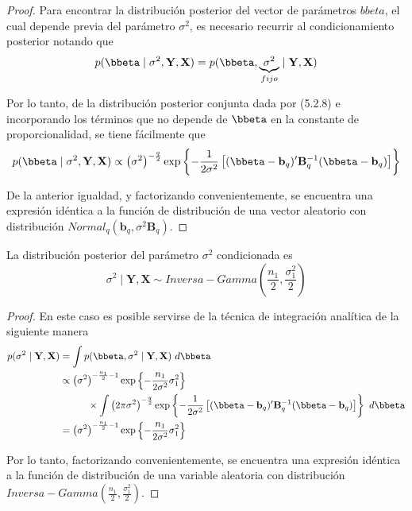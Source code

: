 \begin{proof}
Para encontrar la distribución posterior del vector de parámetros $bbeta$, el cual depende previa del parámetro $\sigma^2$, es necesario recurrir al condicionamiento posterior notando que
\begin{equation*}
p(\bbeta \mid \sigma^2,\mathbf{Y},\mathbf{X})=p(\bbeta,\underbrace{\sigma^2}_{fijo} \mid \mathbf{Y},\mathbf{X})
\end{equation*}

Por lo tanto, de la distribución posterior conjunta dada por (5.2.8) e incorporando los términos que no depende de $\bbeta$ en la constante de proporcionalidad, se tiene fácilmente que
\begin{equation*}
p(\bbeta \mid \sigma^2,\mathbf{Y},\mathbf{X})\propto
\left(\sigma^2\right)^{-\frac{q}{2}}
\exp\left\{-\frac{1}{2\sigma^2}
\left[(\bbeta-\mathbf{b}_q)'\mathbf{B}^{-1}_q(\bbeta-\mathbf{b}_q)\right]
\right\}
\end{equation*}

De la anterior igualdad, y factorizando convenientemente, se encuentra una expresión idéntica a la función de distribución de una vector aleatorio con distribución $Normal_q(\mathbf{b}_q,\sigma^2\mathbf{B}_q)$.
\end{proof}

\begin{Res}
La distribución posterior del parámetro $\sigma^2$ condicionada es
\begin{equation*}
\sigma^2 \mid \mathbf{Y},\mathbf{X} \sim Inversa-Gamma\left(\frac{n_1}{2},\frac{\sigma^2_1}{2}\right)
\end{equation*}
\end{Res}

\begin{proof}
En este caso es posible servirse de la técnica de integración analítica de la siguiente manera
\begin{align*}
p(\sigma^2 \mid \mathbf{Y},\mathbf{X})&=\int p(\bbeta,\sigma^2 \mid \mathbf{Y},\mathbf{X})\ d\bbeta\\
&\propto\left(\sigma^2\right)^{-\frac{n_1}{2}-1}
\exp\left\{-\frac{n_1}{2\sigma^2}\sigma_1^2 \right\}\\
&\hspace{1cm}\times
\int\left(2\pi \sigma^2\right)^{-\frac{q}{2}}
\exp\left\{-\frac{1}{2\sigma^2}
\left[(\bbeta-\mathbf{b}_q)'\mathbf{B}^{-1}_q(\bbeta-\mathbf{b}_q)\right]\right\}\ d\bbeta\\
&=\left(\sigma^2\right)^{-\frac{n_1}{2}-1}
\exp\left\{-\frac{n_1}{2\sigma^2}\sigma_1^2 \right\}
\end{align*}

Por lo tanto, factorizando convenientemente, se encuentra una expresión idéntica a la función de distribución de una variable aleatoria con distribución $Inversa-Gamma\left(\frac{n_1}{2},\frac{\sigma^2_1}{2}\right)$.
\end{proof}

